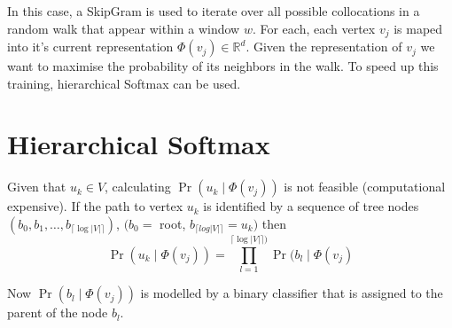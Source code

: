 \documentclass{article}
\begin{document}
In this case, a SkipGram is used to iterate over all possible collocations in a random walk
that appear within a window $w$. For each, each vertex $v_j$ is maped into it's current representation
$\Phi(v_j) \in \mathbb{R}^d$. Given the representation of $v_j$ we want to maximise the probability
of its neighbors in the walk. To speed up this training, hierarchical Softmax can be used.

\section{Hierarchical Softmax}
Given that $u_k \in V$, calculating $\Pr (u_k \mid \Phi(v_j))$ is not feasible
(computational expensive). If the path to vertex $u_k$ is identified by a
sequence of tree nodes $\left(b_0, b_1, \ldots, b_{\lceil \log \vert V \vert \rceil}\right)$,
$(b_0 =$ root, $b_{\lceil log \vert V \vert \rceil} = u_k)$ then
\begin{equation}
  \Pr(u_k \mid \Phi(v_j)) = \prod_{l=1}^{\lceil \log \vert V \vert \rceil )}\Pr(b_l \mid \Phi(v_j)
  \label{eq:5}
\end{equation}

Now $\Pr(b_l \mid \Phi(v_j))$ is modelled by a binary classifier that is assigned to the parent of the node $b_l$.
\end{document}
